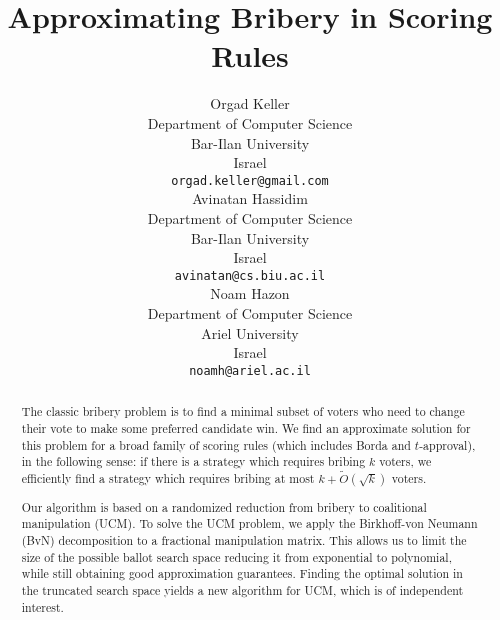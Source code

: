 \documentclass[letterpaper]{article} %
\theoremstyle{definition}
\begin{document}
\title{Approximating Bribery in Scoring Rules}
\author{Orgad Keller\\
Department of Computer Science\\
Bar-Ilan University\\ 
Israel\\
\texttt{orgad.keller@gmail.com}\\
\And Avinatan Hassidim\\
Department of Computer Science\\
Bar-Ilan University\\
Israel\\
\texttt{avinatan@cs.biu.ac.il}\\ 
\And Noam Hazon\\
Department of Computer Science\\
Ariel University\\
Israel\\
\texttt{noamh@ariel.ac.il}}

%
\maketitle
\begin{abstract}
The classic bribery problem is to find a minimal subset of voters who need to change their vote to make some preferred candidate win. We find an approximate solution for this problem for a broad family of scoring rules (which includes Borda and $t$-approval), in the following sense: if there is a strategy which requires bribing $k$ voters, we efficiently find a strategy which requires bribing at most $k+\widetilde{O}(\sqrt{k})$ voters.

Our algorithm is based on a randomized reduction from bribery to coalitional manipulation (UCM). To solve the UCM problem, we apply the Birkhoff-von Neumann (BvN) decomposition to a fractional manipulation matrix. This allows us to  limit the size of the possible ballot search space reducing it from exponential to polynomial, while still obtaining good approximation guarantees. 	Finding the optimal solution in the truncated search space yields a new algorithm for UCM, which is of independent interest.
\end{abstract}
\end{document}
